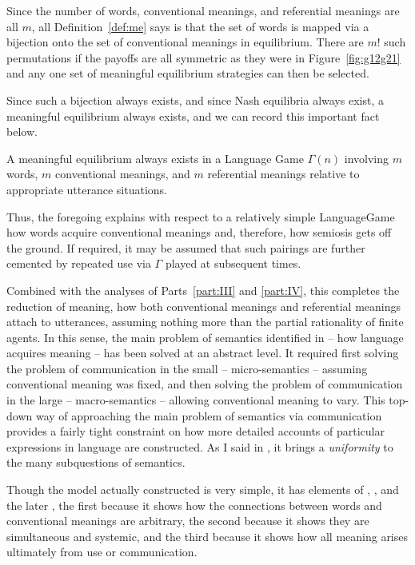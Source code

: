 Since the number of words, conventional meanings, and referential meanings are all $m$, all Definition~\ref{def:me} says is that the set of words is mapped via a bijection onto the set of conventional meanings in equilibrium. There are $m!$ such permutations if the payoffs are all symmetric as they were in Figure~\ref{fig:g12g21} and any one set of meaningful equilibrium strategies can then be selected.

Since such a bijection always exists, and since Nash equilibria always exist, a meaningful equilibrium always exists, and we can record this important fact below.

\begin{theorem}

A meaningful equilibrium always exists in a Language Game $\Gamma(n)$ involving $m$ words, $m$ conventional meanings, and $m$ referential meanings relative to appropriate utterance situations.

\label{thm:me}
\end{theorem}

Thus, the foregoing explains with respect to a relatively simple Language\linebreak Game how words acquire conventional meanings and, therefore, how semiosis gets off the ground. If required, it may be assumed that such pairings are further cemented by repeated use via $\Gamma$ played at subsequent times. 

Combined with the analyses of Parts~\ref{part:III} and \ref{part:IV}, this completes the reduction of meaning, how both conventional meanings and referential meanings attach to utterances, assuming nothing more than the partial rationality of finite agents. In this sense, the main problem of semantics identified in  -- how language acquires meaning -- has been solved at an abstract level. It required first solving the problem of communication in the small -- micro-semantics -- assuming conventional meaning was fixed, and then solving the problem of communication in the large -- macro-semantics -- allowing conventional meaning to vary. This top-down way of approaching the main problem of semantics via communication provides a fairly tight constraint on how more detailed accounts of particular expressions in language are constructed. As I said in , it brings a \emph{uniformity} to the many subquestions of semantics.

Though the model actually constructed is very simple, it has elements of \citet{peirce:ws}, \citet{saussure:clg, saussure:cgl}, and the later \citet{wittgenstein:pi}, the first because it shows how the connections between words and conventional meanings are arbitrary, the second because it shows they are simultaneous and systemic, and the third because it shows how all meaning arises ultimately from use or communication.

